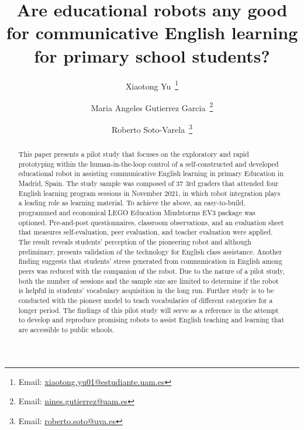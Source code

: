 \documentclass[english]{textolivre}
\title{Are educational robots any good for communicative English learning for primary school students?}
\author[1]{Xiaotong Yu~\orcid{0000-0001-6161-2498}\thanks{Email: \href{mailto:xiaotong.yu01@estudiante.uam.es}{xiaotong.yu01@estudiante.uam.es}}}
\author[1]{Maria Angeles Gutierrez Garcia~\orcid{0000-0001-7376-6064}\thanks{Email: \href{mailto:nines.gutierrez@uam.es}{nines.gutierrez@uam.es}}}
\author[2]{Roberto Soto-Varela~\orcid{0000-0003-2105-5580}\thanks{Email: \href{mailto:roberto.soto@uva.es}{roberto.soto@uva.es}}}
\affil[1]{Autonomous University of Madrid, Department of Pedagogy, Spain.}
\affil[2]{University of Valladolid, Faculty of Education of Segovia, Spain.}
\begin{document}
\maketitle

\begin{polyabstract}
\begin{abstract}
This paper presents a pilot study that focuses on the exploratory and rapid prototyping within the human-in-the-loop control of a self-constructed and developed educational robot in assisting communicative English learning in primary Education in Madrid, Spain. The study sample was composed of 37 3rd graders that attended four English learning program sessions in November 2021, in which robot integration plays a leading role as learning material. To achieve the above, an easy-to-build, programmed and economical LEGO Education Mindstorms EV3 package was optioned. Pre-and-post questionnaires, classroom observations, and an evaluation sheet that measures self-evaluation, peer evaluation, and teacher evaluation were applied. The result reveals students’ perception of the pioneering robot and although preliminary, presents validation of the technology for English class assistance. Another finding suggests that students’ stress generated from communication in English among peers was reduced with the companion of the robot. Due to the nature of a pilot study, both the number of sessions and the sample size are limited to determine if the robot is helpful in students’ vocabulary acquisition in the long run. Further study is to be conducted with the pioneer model to teach vocabularies of different categories for a longer period. The findings of this pilot study will serve as a reference in the attempt to develop and reproduce promising robots to assist English teaching and learning that are accessible to public schools.

\end{abstract}


\end{polyabstract}
\end{document}
